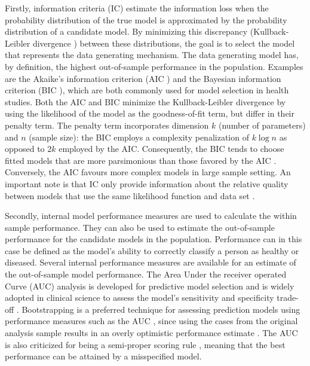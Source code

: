 \documentclass[AMA,STIX1COL]{WileyNJD-v5}
\begin{document}
Firstly, information criteria (IC) estimate the information loss when
the probability distribution of the true model is approximated by the
probability distribution of a candidate model. By minimizing this
discrepancy (Kullback-Leibler divergence
\citep{kullbackInformationSufficiency1951}) between these distributions,
the goal is to select the model that represents the data generating
mechanism. The data generating model has, by definition, the highest
out-of-sample performance in the population. Examples are the Akaike's
information criterion (AIC \citep{akaikeNewLookStatistical1974}) and the
Bayesian information criterion (BIC
\citep{schwarzEstimatingDimensionModel1978}), which are both commonly
used for model selection in health studies. Both the AIC and BIC
minimize the Kullback-Leibler divergence by using the likelihood of the
model as the goodness-of-fit term, but differ in their penalty term. The
penalty term incorporates dimension \(k\) (number of parameters) and
\(n\) (sample size): the BIC employs a complexity penalization of
\(k\log n\) as opposed to \(2k\) employed by the AIC. Consequently, the
BIC tends to choose fitted models that are more parsimonious than those
favored by the AIC \citep{neathBayesianInformationCriterion2012}.
Conversely, the AIC favours more complex models in large sample setting.
An important note is that IC only provide information about the relative
quality between models that use the same likelihood function and data
set \citep{chowdhuryVariableSelectionStrategies2020}.

Secondly, internal model performance measures are used to calculate the
within sample performance. They can also be used to estimate the
out-of-sample performance for the candidate models in the population.
Performance can in this case be defined as the model's ability to
correctly classify a person as healthy or diseased. Several internal
performance measures are available for an estimate of the out-of-sample
model performance. The Area Under the receiver operated Curve (AUC)
analysis is developed for predictive model selection
\citep{pepeInterpretationROCCurve2000} and is widely adopted in clinical
science to assess the model's sensitivity and specificity trade-off
\citep{collinsTransparentReportingMultivariable2015}. Bootstrapping is a
preferred technique for assessing prediction models using performance
measures such as the AUC \citep{harrellRegressionModelingStrategies2015}
\citep{steyerbergInternalExternalValidation2003}, since using the cases
from the original analysis sample results in an overly optimistic
performance estimate
\citep{ledellComputationallyEfficientConfidence2015}. The AUC is also
criticized for being a semi-proper scoring rule
\citep{zhouRelationshipIncrementalValues2021}, meaning that the best
performance can be attained by a misspecified model.
\end{document}
